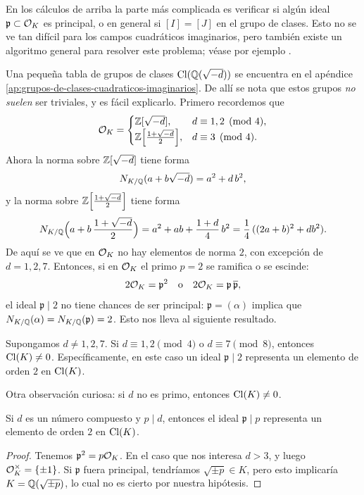 \begin{comentario}
  En los cálculos de arriba la parte más complicada es verificar si algún ideal
  $\mathfrak{p} \subset \mathcal{O}_K$ es principal, o en general si $[I] = [J]$ en el
  grupo de clases. Esto no se ve tan difícil para los campos cuadráticos
  imaginarios, pero también existe un algoritmo general para resolver este
  problema; véase por ejemplo \cite{Buchmann-Williams-1987}.
\end{comentario}

Una pequeña tabla de grupos de clases $\operatorname{Cl} (\mathbb{Q} (\sqrt{-d}))$ se encuentra en el
apéndice \ref{ap:grupos-de-clases-cuadraticos-imaginarios}. De allí se nota que
estos grupos \emph{no suelen} ser triviales, y es fácil explicarlo.
Primero recordemos que
\[ \mathcal{O}_K = \begin{cases}
  \mathbb{Z} [\sqrt{-d}], & d \equiv 1,2 \pmod{4},\\
  \mathbb{Z} \Bigl[\frac{1+\sqrt{-d}}{2}\Bigr], & d \equiv 3 \pmod{4}.
\end{cases} \]
Ahora la norma sobre $\mathbb{Z} [\sqrt{-d}]$ tiene forma
$$N_{K/\mathbb{Q}} (a + b\sqrt{-d}) = a^2 + d\,b^2,$$
y la norma sobre $\mathbb{Z} \Bigl[\frac{1+\sqrt{-d}}{2}\Bigr]$ tiene forma
$$N_{K/\mathbb{Q}} \Bigl(a + b\,\frac{1+\sqrt{-d}}{2}\Bigr) = a^2 + ab + \frac{1+d}{4}\,b^2 = \frac{1}{4}\,((2a + b)^2 + db^2).$$
De aquí se ve que en $\mathcal{O}_K$ no hay elementos de norma $2$, con excepción de
$d = 1,2,7$. Entonces, si en $\mathcal{O}_K$ el primo $p = 2$ se ramifica o se escinde:
\[ 2\mathcal{O}_K = \mathfrak{p}^2 \quad\text{o}\quad
2\mathcal{O}_K = \mathfrak{p}\,\overline{\mathfrak{p}}, \]
el ideal $\mathfrak{p} \mid 2$ no tiene chances de ser principal:
$\mathfrak{p} = (\alpha)$ implica que
$N_{K/\mathbb{Q}} (\alpha) = N_{K/\mathbb{Q}} (\mathfrak{p}) = 2$.
Esto nos lleva al siguiente resultado.

\begin{proposicion}
  \label{prop:Cl(K)=0-d=3(8)}
  Supongamos $d \ne 1,2,7$. Si $d \equiv 1,2 \pmod{4}$ o $d \equiv 7 \pmod{8}$,
  entonces $\operatorname{Cl} (K) \ne 0$. Específicamente, en este caso un ideal
  $\mathfrak{p} \mid 2$ representa un elemento de orden $2$ en
  $\operatorname{Cl} (K)$.
\end{proposicion}

Otra observación curiosa: si $d$ no es primo, entonces $\operatorname{Cl} (K) \ne 0$.

\begin{proposicion}
  Si $d$ es un número compuesto y $p \mid d$, entonces el ideal
  $\mathfrak{p} \mid p$ representa un elemento de orden $2$ en $\operatorname{Cl} (K)$.

  \begin{proof}
    Tenemos $\mathfrak{p}^2 = p \mathcal{O}_K$. En el caso que nos interesa $d > 3$,
    y luego $\mathcal{O}_K^\times = \{ \pm 1 \}$. Si $\mathfrak{p}$ fuera principal,
    tendríamos $\sqrt{\pm p} \in K$, pero esto implicaría
    $K = \mathbb{Q} (\sqrt{\pm p})$, lo cual no es cierto por nuestra hipótesis.
  \end{proof}
\end{proposicion}


